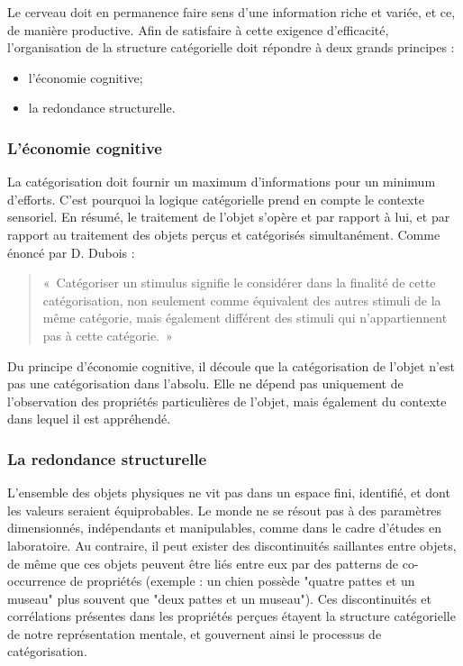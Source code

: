 Le cerveau doit en permanence faire sens d'une information riche et variée, et ce, de manière productive. Afin de satisfaire à cette exigence d'efficacité, l'organisation de la structure catégorielle doit répondre à deux grands principes \citep[p. 29]{rosch1978cognition}:

\begin{itemize}
\item l'économie cognitive;
\item la redondance structurelle.
\end{itemize}

\subsubsection{L'économie cognitive}

La catégorisation doit fournir un maximum d'informations pour un minimum d'efforts. C'est pourquoi la logique catégorielle prend en compte le contexte sensoriel. En résumé, le traitement de l'objet s'opère et par rapport à lui, et par rapport au traitement des objets perçus et catégorisés simultanément. Comme énoncé par D. Dubois \citep[p. 33]{dubois1991semantique}:

\begin{quote}
«~Catégoriser un stimulus signifie le considérer dans la finalité de cette catégorisation, non seulement comme équivalent des autres stimuli de la même catégorie, mais également différent des stimuli qui n'appartiennent pas à cette catégorie.~»
\end{quote}

Du principe d'économie cognitive, il découle que la catégorisation de l'objet n'est pas une catégorisation dans l'absolu. Elle ne dépend pas uniquement de l'observation des propriétés particulières de l'objet, mais également du contexte dans lequel il est appréhendé.

\subsubsection{La redondance structurelle}

L'ensemble des objets physiques ne vit pas dans un espace fini, identifié, et dont les valeurs seraient équiprobables. Le monde ne se résout pas à des paramètres dimensionnés, indépendants et manipulables, comme dans le cadre d'études en laboratoire. Au contraire, il peut exister des discontinuités saillantes entre objets, de même que ces objets peuvent être liés entre eux par des patterns de co-occurrence de propriétés (exemple : un chien possède "quatre pattes et un museau" plus souvent que "deux pattes et un museau"). Ces discontinuités et corrélations présentes dans les propriétés perçues étayent la structure catégorielle de notre représentation mentale, et gouvernent ainsi le processus de catégorisation.
 
